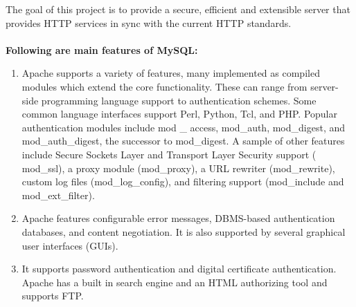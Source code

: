 The goal of this project is to provide a secure, efficient and extensible server that provides HTTP services in sync with the current HTTP standards.\\\\
{\bf Following are main features of MySQL:}
\begin{enumerate}
\item Apache supports a variety of features, many implemented as compiled modules which extend the core functionality. These can range from server-side programming language support to authentication schemes. Some common language interfaces support Perl, Python, Tcl, and PHP. Popular authentication modules include mod \_ access, mod\_auth, mod\_digest, and mod\_auth\_digest, the successor to mod\_digest. A sample of other features include Secure Sockets Layer and Transport Layer Security support ( mod\_ssl), a proxy module (mod\_proxy), a URL rewriter (mod\_rewrite), custom log files (mod\_log\_config), and filtering support (mod\_include and mod\_ext\_filter).

\item Apache features configurable error messages, DBMS-based authentication databases, and content negotiation. It is also supported by several graphical user interfaces (GUIs).

\item It supports password authentication and digital certificate authentication. Apache has a built in search engine and an HTML authorizing tool and supports FTP.
\end{enumerate}
\newpage
